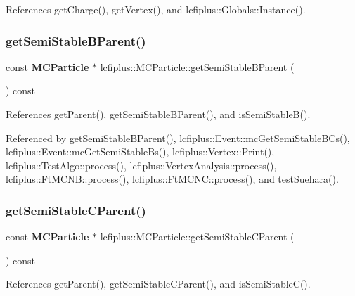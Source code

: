 References get\+Charge(), get\+Vertex(), and lcfiplus\+::\+Globals\+::\+Instance().

\mbox{\label{classlcfiplus_1_1MCParticle_a839728f53b67657a86594453fe0379ac}} 
\subsubsection{get\+Semi\+Stable\+B\+Parent()}
{\footnotesize\ttfamily const \textbf{ M\+C\+Particle} $\ast$ lcfiplus\+::\+M\+C\+Particle\+::get\+Semi\+Stable\+B\+Parent (\begin{DoxyParamCaption}{ }\end{DoxyParamCaption}) const}



References get\+Parent(), get\+Semi\+Stable\+B\+Parent(), and is\+Semi\+Stable\+B().



Referenced by get\+Semi\+Stable\+B\+Parent(), lcfiplus\+::\+Event\+::mc\+Get\+Semi\+Stable\+B\+Cs(), lcfiplus\+::\+Event\+::mc\+Get\+Semi\+Stable\+Bs(), lcfiplus\+::\+Vertex\+::\+Print(), lcfiplus\+::\+Test\+Algo\+::process(), lcfiplus\+::\+Vertex\+Analysis\+::process(), lcfiplus\+::\+Ft\+M\+C\+N\+B\+::process(), lcfiplus\+::\+Ft\+M\+C\+N\+C\+::process(), and test\+Suehara().

\mbox{\label{classlcfiplus_1_1MCParticle_a2f9b546459d73c5de8d9488eb5f815e6}} 
\subsubsection{get\+Semi\+Stable\+C\+Parent()}
{\footnotesize\ttfamily const \textbf{ M\+C\+Particle} $\ast$ lcfiplus\+::\+M\+C\+Particle\+::get\+Semi\+Stable\+C\+Parent (\begin{DoxyParamCaption}{ }\end{DoxyParamCaption}) const}



References get\+Parent(), get\+Semi\+Stable\+C\+Parent(), and is\+Semi\+Stable\+C().



